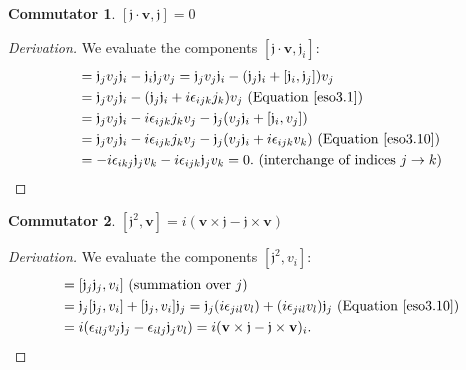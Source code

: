\documentclass[12pt,a4paper]{report}
\theoremstyle{definition}
\newtheorem{commutator}{Commutator}[section]
\newenvironment{derivation}
  {\renewcommand\qedsymbol{$\square$}\begin{proof}[Derivation]}
  {\end{proof}}
\theoremstyle{remark}
\theoremstyle{remark}
\begin{document}
\begin{appendices}
\begin{commutator}\label{cv1}$[\mathfrak{j}\cdot\mathbf{v},\mathfrak{j}]=0$
\end{commutator}
\begin{derivation}We evaluate the components $[\mathfrak{j}\cdot\mathbf{v},\mathfrak{j}_i]$:
\begin{align*}
[\mathfrak{j}\cdot\mathbf{v},\mathfrak{j}_i]&=\mathfrak{j}_jv_j\mathfrak{j}_i-\mathfrak{j}_i\mathfrak{j}_jv_j=\mathfrak{j}_jv_j\mathfrak{j}_i-(\mathfrak{j}_j\mathfrak{j}_i+[\mathfrak{j}_i,\mathfrak{j}_j])v_j\\
&=\mathfrak{j}_jv_j\mathfrak{j}_i-(\mathfrak{j}_j\mathfrak{j}_i+i\epsilon_{ijk}j_k)v_j \text{ (Equation~\ref{eso3.1})}\\
&=\mathfrak{j}_jv_j\mathfrak{j}_i-i\epsilon_{ijk}j_kv_j-\mathfrak{j}_j(v_j\mathfrak{j}_i+[\mathfrak{j}_i,v_j])\\
&=\mathfrak{j}_jv_j\mathfrak{j}_i-i\epsilon_{ijk}j_kv_j-\mathfrak{j}_j(v_j\mathfrak{j}_i+i\epsilon_{ijk}v_k) \text{ (Equation~\ref{eso3.10})}\\
&=-i\epsilon_{ikj}\mathfrak{j}_jv_k-i\epsilon_{ijk}\mathfrak{j}_jv_k=0. \text{ (interchange of indices }j\rightarrow k)
\end{align*}
\end{derivation}

\begin{commutator}\label{cv2}$[\mathfrak{j}^2,\textbf{v}]=i(\mathbf{v}\times\mathfrak{j}-\mathfrak{j}\times\mathbf{v})$
\end{commutator}
\begin{derivation}We evaluate the components $[\mathfrak{j}^2,v_i]$:
\begin{align*}
[\mathfrak{j}^2,v_i]&=[\mathfrak{j}_j\mathfrak{j}_j,v_i] \text{ (summation over }j)\\
&=\mathfrak{j}_j[\mathfrak{j}_j,v_i]+[\mathfrak{j}_j,v_i]\mathfrak{j}_j=\mathfrak{j}_j(i\epsilon_{jil}v_l)+(i\epsilon_{jil}v_l)\mathfrak{j}_j \text{ (Equation~\ref{eso3.10})}\\
&=i(\epsilon_{ilj}v_j\mathfrak{j}_j-\epsilon_{ilj}\mathfrak{j}_jv_l)=i(\mathbf{v}\times\mathfrak{j}-\mathfrak{j}\times\mathbf{v})_i.
\end{align*}
\end{derivation}


\end{appendices}
\end{document}
